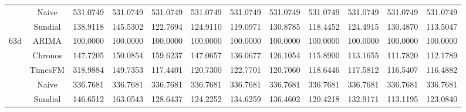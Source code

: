 \begin{table}[H]
{\begin{tabular}{cccccccccccc}
 & Naive & 531.0749 & 531.0749 & 531.0749 & 531.0749 & 531.0749 & 531.0749 & 531.0749 & 531.0749 & 531.0749 & 531.0749 \\
 & Sundial & 138.9118 & 145.5302 & 122.7694 & 124.9110 & 119.0971 & 130.8785 & 118.4452 & 124.4915 & 130.4870 & 113.5047 \\
\midrule
\multirow[c]{5}{*}{63d} & ARIMA & 100.0000 & 100.0000 & 100.0000 & 100.0000 & 100.0000 & 100.0000 & 100.0000 & 100.0000 & 100.0000 & 100.0000 \\
 & Chronos & 147.7205 & 150.0854 & 159.6237 & 147.0657 & 136.0677 & 126.1054 & 115.8900 & 113.1655 & 111.7820 & 112.1789 \\
 & TimesFM & 318.9884 & 149.7353 & 117.4401 & 120.7300 & 122.7701 & 120.7060 & 118.6446 & 117.5812 & 116.5407 & 116.4882 \\
 & Naive & 336.7681 & 336.7681 & 336.7681 & 336.7681 & 336.7681 & 336.7681 & 336.7681 & 336.7681 & 336.7681 & 336.7681 \\
 & Sundial & 146.6512 & 163.0543 & 128.6437 & 124.2252 & 134.6259 & 136.4602 & 120.4218 & 132.9171 & 113.1195 & 123.0840 \\
\bottomrule
\end{tabular}

 }
\end{table}